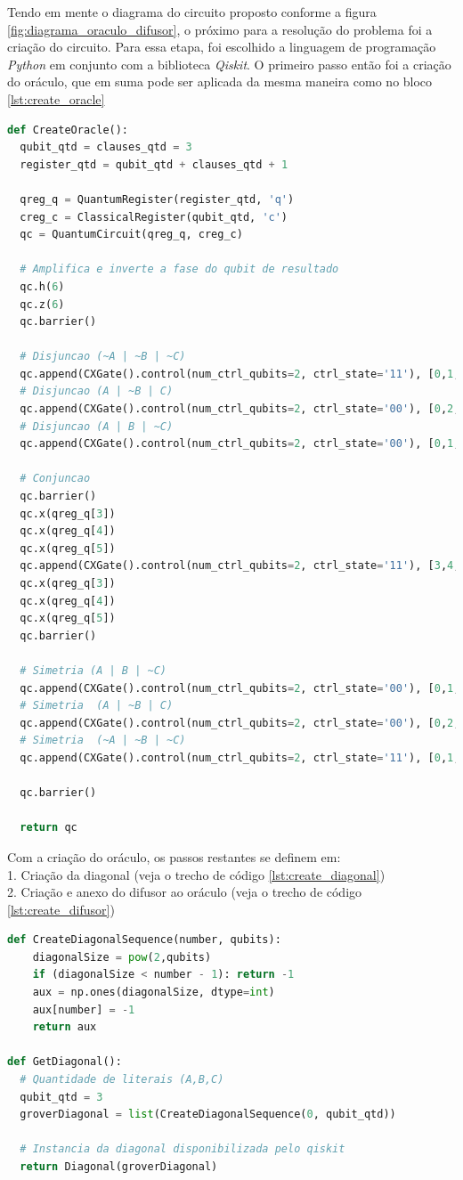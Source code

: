 \documentclass[12pt]{article}
\begin{document}
Tendo em mente o diagrama do circuito proposto conforme a figura \ref{fig:diagrama_oraculo_difusor}, o próximo para a resolução do problema foi a criação do circuito. Para essa etapa, foi escolhido a linguagem de programação \textit{Python} em conjunto com a biblioteca \textit{Qiskit}.
O primeiro passo então foi a criação do oráculo, que em suma pode ser aplicada da mesma maneira como no bloco \ref{lst:create_oracle}
\begin{lstlisting}[language=Python, caption={Criação do oráculo}, frame=single, label={lst:create_oracle}]
def CreateOracle():
  qubit_qtd = clauses_qtd = 3
  register_qtd = qubit_qtd + clauses_qtd + 1

  qreg_q = QuantumRegister(register_qtd, 'q')
  creg_c = ClassicalRegister(qubit_qtd, 'c')
  qc = QuantumCircuit(qreg_q, creg_c)

  # Amplifica e inverte a fase do qubit de resultado
  qc.h(6)
  qc.z(6)
  qc.barrier()
  
  # Disjuncao (~A | ~B | ~C)
  qc.append(CXGate().control(num_ctrl_qubits=2, ctrl_state='11'), [0,1,2,3])
  # Disjuncao (A | ~B | C)
  qc.append(CXGate().control(num_ctrl_qubits=2, ctrl_state='00'), [0,2,1,4])
  # Disjuncao (A | B | ~C)
  qc.append(CXGate().control(num_ctrl_qubits=2, ctrl_state='00'), [0,1,2,5])

  # Conjuncao
  qc.barrier()
  qc.x(qreg_q[3])
  qc.x(qreg_q[4])
  qc.x(qreg_q[5])
  qc.append(CXGate().control(num_ctrl_qubits=2, ctrl_state='11'), [3,4,5,6])
  qc.x(qreg_q[3])
  qc.x(qreg_q[4])
  qc.x(qreg_q[5])
  qc.barrier()

  # Simetria (A | B | ~C)
  qc.append(CXGate().control(num_ctrl_qubits=2, ctrl_state='00'), [0,1,2,5])
  # Simetria  (A | ~B | C)
  qc.append(CXGate().control(num_ctrl_qubits=2, ctrl_state='00'), [0,2,1,4])
  # Simetria  (~A | ~B | ~C)
  qc.append(CXGate().control(num_ctrl_qubits=2, ctrl_state='11'), [0,1,2,3])

  qc.barrier()

  return qc
\end{lstlisting}
Com a criação do oráculo, os passos restantes se definem em: \\
1. Criação da diagonal (veja o trecho de código \ref{lst:create_diagonal})\\
2. Criação e anexo do difusor ao oráculo (veja o trecho de código \ref{lst:create_difusor})\\

\begin{lstlisting}[language=Python, caption={Criação da diagonal}, frame=single, label={lst:create_diagonal}]
def CreateDiagonalSequence(number, qubits):
    diagonalSize = pow(2,qubits)
    if (diagonalSize < number - 1): return -1
    aux = np.ones(diagonalSize, dtype=int)
    aux[number] = -1
    return aux

def GetDiagonal():
  # Quantidade de literais (A,B,C)
  qubit_qtd = 3
  groverDiagonal = list(CreateDiagonalSequence(0, qubit_qtd))
  
  # Instancia da diagonal disponibilizada pelo qiskit
  return Diagonal(groverDiagonal) 
\end{lstlisting}
\end{document}
